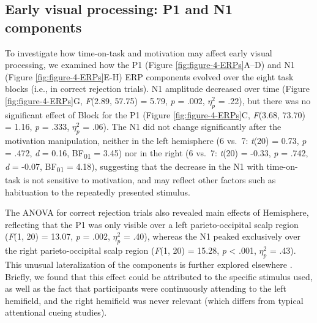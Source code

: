 \documentclass[11pt,]{memoir}
\begin{document}
\hypertarget{early-visual-processing-p1-and-n1-components}{%
\subsection{Early visual processing: P1 and N1 components}\label{early-visual-processing-p1-and-n1-components}}

To investigate how time-on-task and motivation may affect early visual processing, we examined how the P1 (Figure \ref{fig:figure-4-ERPs}A--D) and N1 (Figure \ref{fig:figure-4-ERPs}E-H) ERP components evolved over the eight task blocks (i.e., in correct rejection trials). N1 amplitude decreased over time (Figure \ref{fig:figure-4-ERPs}G, \emph{F}(2.89, 57.75) = 5.79, \emph{p} = .002, \(\eta^2_p\) = .22), but there was no significant effect of Block for the P1 (Figure \ref{fig:figure-4-ERPs}C, \emph{F}(3.68, 73.70) = 1.16, \emph{p} = .333, \(\eta^2_p\) = .06). The N1 did not change significantly after the motivation manipulation, neither in the left hemisphere (6 vs.~7: \emph{t}(20) = 0.73, \emph{p} = .472, \emph{d} = 0.16, BF\textsubscript{01} = 3.45) nor in the right (6 vs.~7: \emph{t}(20) = -0.33, \emph{p} = .742, \emph{d} = -0.07, BF\textsubscript{01} = 4.18), suggesting that the decrease in the N1 with time-on-task is not sensitive to motivation, and may reflect other factors such as habituation to the repeatedly presented stimulus.

The ANOVA for correct rejection trials also revealed main effects of Hemisphere, reflecting that the P1 was only visible over a left parieto-occipital scalp region (\emph{F}(1, 20) = 13.07, \emph{p} = .002, \(\eta^2_p\) = .40), whereas the N1 peaked exclusively over the right parieto-occipital scalp region (\emph{F}(1, 20) = 15.28, \emph{p} \textless{} .001, \(\eta^2_p\) = .43). This unusual lateralization of the components is further explored elsewhere \autocite{Slagter2016}. Briefly, we found that this effect could be attributed to the specific stimulus used, as well as the fact that participants were continuously attending to the left hemifield, and the right hemifield was never relevant (which differs from typical attentional cueing studies).
\end{document}
